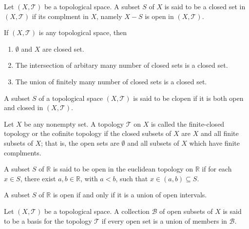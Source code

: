 \begin{defn}
    Let \((X, \mathcal{T})\) be a topological space. A subset \(S\) of \(X\) is said to be a closed set in \((X, \mathcal{T})\) if its complment in \(X\), namely \(X - S\) is open in \((X, \mathcal{T})\).
\end{defn}

\begin{prps}
    If \((X, \mathcal{T})\) is any topological space, then
    \begin{enumerate}
        \item \(\emptyset\) and \(X\) are closed set.
        \item The intersection of arbitary many number of closed sets is a closed set.
        \item The union of finitely many number of closed sets is a closed set.
    \end{enumerate}
\end{prps}

\begin{defn}
    A subset \(S\) of a topological space \((X, \mathcal{T})\) is said to be clopen if it is both open and closed in \((X, \mathcal{T})\).
\end{defn}

\begin{defn}
    Let \(X\) be any nonempty set. A topology \(\mathcal{T}\) on \(X\) is called the finite-closed topology or the cofinite topology if the closed subsets of \(X\) are \(X\) and all finite subsets of \(X\); that is, the open sets are \(\emptyset\) and all subsets of \(X\) which have finite complments.
\end{defn}

\begin{defn}
    A subset \(S\) of \(\mathbb{R}\) is said to be open in the euclidean topology on \(\mathbb{R}\) if for each \(x \in S\), there exist \(a, b \in \mathbb{R}\), with \(a < b\), such that \(x \in (a, b) \subseteq S\).
\end{defn}

\begin{prps}
    A subset \(S\) of \(\mathbb{R}\) is open if and only if it is a union of open intervals.
\end{prps}

\begin{defn}
    Let \((X, \mathcal{T})\) be a topological space. A collection \(\mathcal{B}\) of open subsets of \(X\) is said to be a basis for the topology \(\mathcal{T}\) if every open set is a union of members in \(\mathcal{B}\).
\end{defn}


